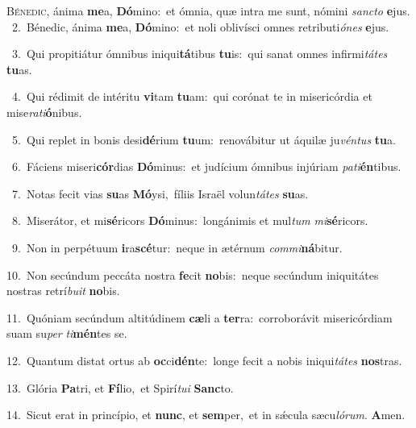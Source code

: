 \lettrine{\initial\textcolor{\initialcolor}{B}}{énedic,} ánima \textbf{me}\-a, \textbf{Dó}\-mino:~\star et ómnia, quæ intra me sunt, nómini \textit{sanc}\-\textit{to} \textbf{e}\-jus.\\
{\numbfont\textcolor{\numbcolor}{~2.}}~Bénedic, ánima \textbf{me}\-a, \textbf{Dó}\-mino:~\star et noli oblivísci omnes retributi\-\textit{ó}\-\textit{nes} \textbf{e}\-jus.\par
{\numbfont\textcolor{\numbcolor}{~3.}}~Qui propitiátur ómnibus iniqui\-\textbf{tá}\-tibus \textbf{tu}\-is:~\star qui sanat omnes infirmi\-\textit{tá}\-\textit{tes} \textbf{tu}\-as.\par
{\numbfont\textcolor{\numbcolor}{~4.}}~Qui rédimit de intéritu \textbf{vi}\-tam \textbf{tu}\-am:~\star qui corónat te in misericórdia et mise\-\textit{ra}\-\textit{ti}\textbf{ó}nibus.\par
{\numbfont\textcolor{\numbcolor}{~5.}}~Qui replet in bonis desi\-\textbf{dé}\-rium \textbf{tu}\-um:~\star renovábitur ut áquilæ ju\-\textit{vén}\-\textit{tus} \textbf{tu}\-a.\par
{\numbfont\textcolor{\numbcolor}{~6.}}~Fáciens miseri\-\textbf{cór}\-dias \textbf{Dó}\-minus:~\star et judícium ómnibus injúriam \textit{pa}\-\textit{ti}\textbf{én}tibus.\par
{\numbfont\textcolor{\numbcolor}{~7.}}~Notas fecit vias \textbf{su}\-as \textbf{Mó}\-ysi,~\star fíliis Israël volun\-\textit{tá}\-\textit{tes} \textbf{su}\-as.\par
{\numbfont\textcolor{\numbcolor}{~8.}}~Miserátor, et mi\-\textbf{sé}\-ricors \textbf{Dó}\-minus:~\star longánimis et mul\textit{tum} \textit{mi}\-\textbf{sé}ricors.\par
{\numbfont\textcolor{\numbcolor}{~9.}}~Non in perpétuum \textbf{i}\-ra\-\textbf{scé}\-tur:~\star neque in ætérnum \textit{com}\-\textit{mi}\textbf{ná}bitur.\par
{\numbfont\textcolor{\numbcolor}{10.}}~Non secúndum peccáta nostra \textbf{fe}\-cit \textbf{no}\-bis:~\star neque secúndum iniquitátes nostras retrí\-\textit{bu}\-\textit{it} \textbf{no}\-bis.\par
{\numbfont\textcolor{\numbcolor}{11.}}~Quóniam secúndum altitúdinem \textbf{cæ}\-li a \textbf{ter}\-ra:~\star corroborávit misericórdiam suam su\textit{per} \textit{ti}\-\textbf{mén}tes se.\par
{\numbfont\textcolor{\numbcolor}{12.}}~Quantum distat ortus ab \textbf{oc}\-ci\-\textbf{dén}\-te:~\star longe fecit a nobis iniqui\-\textit{tá}\-\textit{tes} \textbf{nos}\-tras.\par
{\numbfont\textcolor{\numbcolor}{13.}}~Glória \textbf{Pa}\-tri, et \textbf{Fí}\-lio,~\star et Spirí\-\textit{tu}\-\textit{i} \textbf{Sanc}\-to.\par
{\numbfont\textcolor{\numbcolor}{14.}}~Sicut erat in princípio, et \textbf{nunc}\-, et \textbf{sem}\-per,~\star et in sǽcula sæcu\-\textit{ló}\-\textit{rum}. \textbf{A}\-men.\par
